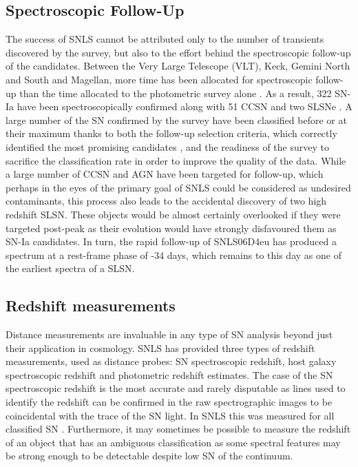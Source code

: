 \subsection{Spectroscopic Follow-Up}
The success of SNLS cannot be attributed only to the number of transients discovered by the survey, but also to the effort behind the spectroscopic follow-up of the candidates. Between the Very Large Telescope (VLT), Keck, Gemini North and South and Magellan, more time has been allocated for spectroscopic follow-up than the time allocated to the photometric survey alone \citep{Pritchet2004}. As a result, 322 SN-Ia have been spectroscopically confirmed along with 51 CCSN and two SLSNe \citep{Guy2010,Howell2005,Howell2013}. A large number of the SN confirmed by the survey have been classified before or at their maximum thanks to both the follow-up selection criteria, which correctly identified the most promising candidates \citep{Sullivan2006}, and the readiness of the survey to sacrifice the classification rate in order to improve the quality of the data. While a large number of CCSN and AGN have been targeted for follow-up, which perhaps in the eyes of the primary goal of SNLS could be considered as undesired contaminants, this process also leads to the accidental discovery of two high redshift SLSN. These objects would be almost certainly overlooked if they were targeted post-peak as their evolution would have strongly disfavoured them as SN-Ia candidates. In turn, the rapid follow-up of SNLS06D4eu has produced a spectrum at a rest-frame phase of -34 days, which remains to this day as one of the earliest spectra of a SLSN.

\subsection{Redshift measurements}
\label{sec:SNLSRedshift}
Distance measurements are invaluable in any type of SN analysis beyond just their application in cosmology. SNLS has provided three types of redshift measurements, used as distance probes: SN spectroscopic redshift, host galaxy spectroscopic redshift and photometric redshift estimates. The case of the SN spectroscopic redshift is the most accurate and rarely disputable as lines used to identify the redshift can be confirmed in the raw spectrographic images to be coincidental with the trace of the SN light. In SNLS this was measured for all classified SN \citep{Howell2005,Bronder2007,Ellis2008,Balland2009}. Furthermore, it may sometimes be possible to measure the redshift of an object that has an ambiguous classification as some spectral features may be strong enough to be detectable despite low S\/N of the continuum.

